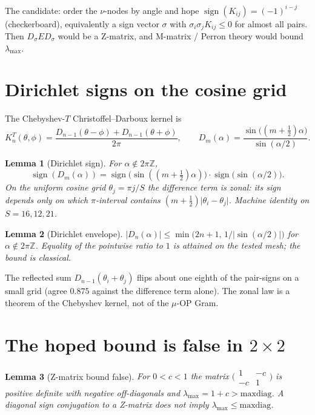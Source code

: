 \documentclass[11pt]{article}
\newtheorem{lemma}{Lemma}
\theoremstyle{remark}
\begin{document}
The candidate: order the $\nu$-nodes by angle and hope
$\operatorname{sign}(K_{ij})=(-1)^{i-j}$ (checkerboard),
equivalently a sign vector $\sigma$ with
$\sigma_i\sigma_j K_{ij}\le 0$ for almost all pairs.
Then $D_\sigma E D_\sigma$ would be a Z-matrix, and
M-matrix / Perron theory would bound $\lambda_{\max}$.

\section{Dirichlet signs on the cosine grid}\label{sec:dirichlet}

The Chebyshev-$T$ Christoffel--Darboux kernel is~\cite{r387}
\[
K_n^T(\theta,\phi)
=
\frac{D_{n-1}(\theta-\phi)+D_{n-1}(\theta+\phi)}{2\pi},
\qquad
D_m(\alpha)
=
\frac{\sin\bigl((m+\tfrac12)\alpha\bigr)}{\sin(\alpha/2)}.
\]

\begin{lemma}[Dirichlet sign]\label{lem:dirichlet-sign}
For $\alpha\not\in 2\pi\mathbb{Z}$,
\[
\operatorname{sign}(D_m(\alpha))
=
\operatorname{sign}\bigl(\sin((m+\tfrac12)\alpha)\bigr)
\cdot
\operatorname{sign}\bigl(\sin(\alpha/2)\bigr).
\]
On the uniform cosine grid $\theta_j=\pi j/S$ the difference
term is zonal: its sign depends only on which $\pi$-interval
contains $(m+\tfrac12)\lvert\theta_i-\theta_j\rvert$.
Machine identity on $S=16,12,21$.
\end{lemma}

\begin{lemma}[Dirichlet envelope]\label{lem:envelope}
$\lvert D_n(\alpha)\rvert\le\min\bigl(2n+1,\,1/\lvert\sin(\alpha/2)\rvert\bigr)$
for $\alpha\not\in 2\pi\mathbb{Z}$.
Equality of the pointwise ratio to $1$ is attained on the
tested mesh; the bound is classical.
\end{lemma}

The reflected sum $D_{n-1}(\theta_i+\theta_j)$ flips about
one eighth of the pair-signs on a small grid (agree $0.875$
against the difference term alone).
The zonal law is a theorem of the Chebyshev kernel, not of
the $\mu$-OP Gram.

\section{The hoped bound is false in \texorpdfstring{$2\times 2$}{2x2}}\label{sec:z}

\begin{lemma}[Z-matrix bound false]\label{lem:zfalse}
For $0<c<1$ the matrix
$\bigl(\begin{smallmatrix}1&-c\\-c&1\end{smallmatrix}\bigr)$
is positive definite with negative off-diagonals and
$\lambda_{\max}=1+c>\mathrm{maxdiag}$.
A diagonal sign conjugation to a Z-matrix does \emph{not}
imply $\lambda_{\max}\le\mathrm{maxdiag}$.
\end{lemma}
\end{document}
